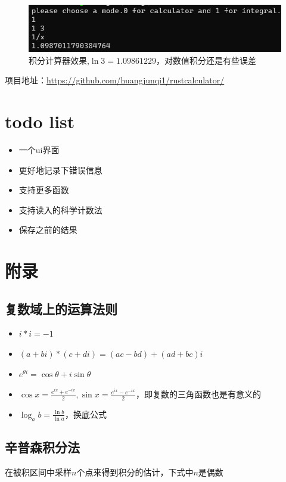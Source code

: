 \documentclass[UTF8,11pt]{ctexart}
\begin{document}
\begin{figure}[!htb]
    \centering
    \includegraphics[scale=1.1]{2.png}
    \caption{积分计算器效果,$\ln 3 = 1.09861229$，对数值积分还是有些误差}
\end{figure}

项目地址：\url{https://github.com/huangjunqi1/rustcalculator/}

\section*{todo list}

\begin{itemize}
    \item  一个ui界面
    \item 更好地记录下错误信息
    \item 支持更多函数
    \item 支持读入的科学计数法
    \item 保存之前的结果
\end{itemize}

\section*{附录}
    \subsection{复数域上的运算法则}\label{lalala}
    \begin{itemize}
        \item $i*i = -1$
        \item $(a+bi)*(c+di) = (ac-bd) + (ad+bc)i$
        \item $e^{\theta i} = \cos\theta + i\sin \theta $\cite{Euler}
        \item $\cos x = \frac{e^{ix}+e^{-ix}}{2},\sin x = \frac{e^{ix}-e^{-ix}}{2}$，即复数的三角函数也是有意义的
        \item $\log_a b = \frac{\ln b}{\ln a}$，换底公式
    \end{itemize}
    \subsection{辛普森积分法}\label{hahaha}
        在被积区间中采样$n$个点来得到积分的估计\cite{Simpson}，下式中$n$是偶数
\end{document}
